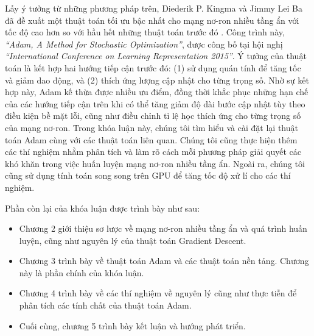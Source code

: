 Lấy ý tưởng từ những phương pháp trên, Diederik P. Kingma và Jimmy Lei Ba đã đề xuất một thuật toán tối ưu bậc nhất cho mạng nơ-ron nhiều tầng ẩn với tốc độ cao hơn so với hầu hết những thuật toán trước đó \cite{kingma2014adam}. Công trình này, \emph{``Adam, A Method for Stochastic Optimization''}, được công bố tại hội nghị \emph{``International Conference on Learning Representation 2015''}. Ý tưởng của thuật toán là kết hợp hai hướng tiếp cận trước đó: (1) sử dụng quán tính để tăng tốc và giảm dao động, và (2) thích ứng lượng cập nhật cho từng trọng số. Nhờ sự kết hợp này, Adam kế thừa được nhiều ưu điểm, đồng thời khắc phục những hạn chế của các hướng tiếp cận trên khi có thể tăng giảm độ dài bước cập nhật tùy theo điều kiện bề mặt lỗi, cũng như điều chỉnh tỉ lệ học thích ứng cho từng trọng số của mạng nơ-ron. Trong khóa luận này, chúng tôi tìm hiểu và cài đặt lại thuật toán Adam cùng với các thuật toán liên quan. Chúng tôi cũng thực hiện thêm các thí nghiệm nhằm phân tích và làm rõ cách mỗi phương pháp giải quyết các khó khăn trong việc huấn luyện mạng nơ-ron nhiều tầng ẩn. Ngoài ra, chúng tôi cũng sử dụng tính toán song song trên GPU để tăng tốc độ xử lí cho các thí nghiệm.

Phần còn lại của khóa luận được trình bày như sau:

\begin{itemize}
	\item Chương 2 giới thiệu sơ lược về mạng nơ-ron nhiều tầng ẩn và quá trình huấn luyện, cũng như nguyên lý của thuật toán Gradient Descent.
	\item Chương 3 trình bày về thuật toán Adam và các thuật toán nền tảng. Chương này là phần chính của khóa luận.
	\item Chương 4 trình bày về các thí nghiệm về nguyên lý cũng như thực tiễn để phân tích các tính chất của thuật toán Adam.
	\item Cuối cùng, chương 5 trình bày kết luận và hướng phát triển.
\end{itemize}
